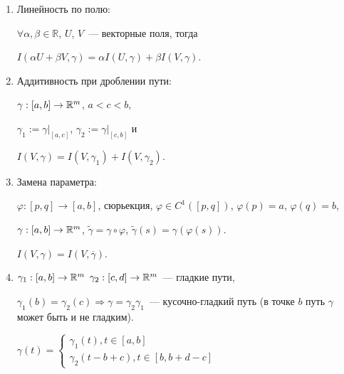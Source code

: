 \documentclass{article}
\begin{document}
        \begin{enumerate}
        
            \item Линейность по полю:
            
                $\forall \alpha, \beta \in \mathbb{R}$, $U$, $V$~--- векторные поля, тогда
                
                $I \left( \alpha U + \beta V, \gamma \right) = \alpha I \left(U, \gamma \right) + \beta I \left( V, \gamma \right)$.
                
            \item Аддитивность при дроблении пути:
            
                $\gamma : [a, b] \rightarrow \mathbb{R}^m$, $a < c < b$,
                
                $\gamma_1 := \gamma \big|_{[a, c]}$, $\gamma_2 := \gamma \big|_{[c, b]}$ и
                
                $I \left( V, \gamma \right) = I \left( V, \gamma_1 \right) + I \left( V, \gamma_2 \right)$.
                
            \item Замена параметра:
            
                $\varphi : [p, q] \rightarrow [a, b]$, сюрьекция, $\varphi \in C^1 \left( [p, q] \right)$, $\varphi(p) = a$, $\varphi(q) = b$,
                
                $\gamma : [a, b] \rightarrow \mathbb{R}^m$, $\widetilde{\gamma} = \gamma \circ \varphi$, $\widetilde{\gamma}(s) = \gamma (\varphi(s))$.
                
                $I \left( V, \gamma \right) = I \left( V, \overline{\gamma} \right)$.
                
            \item $\gamma_1 : [a, b] \rightarrow \mathbb{R}^m$ $\gamma_2 : [c, d] \rightarrow \mathbb{R}^m$~--- гладкие пути,
            
                $\gamma_1(b) = \gamma_2(c) \Rightarrow \gamma = \gamma_2 \gamma_1$~--- кусочно-гладкий путь (в точке $b$ путь $\gamma$ может быть и не гладким).
                
                $\gamma(t) = \begin{cases}
                    \gamma_1(t), t \in [a, b] \\
                    \gamma_2(t - b + c), t \in [b, b + d - c]
                \end{cases}$
                

\end{enumerate}
\end{document}
